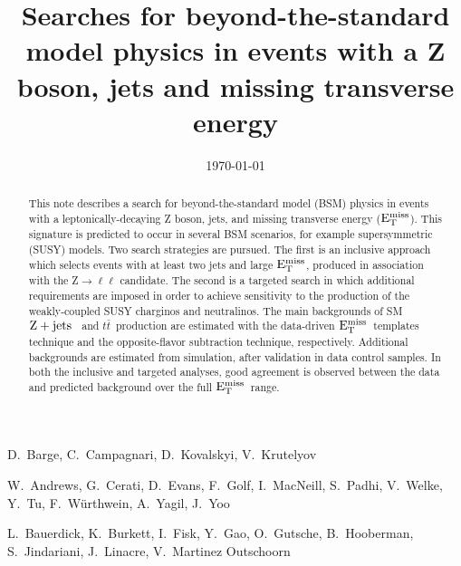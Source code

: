 \documentclass{cmspaper}
\newcommand{\zjets}{$\rm{Z}+\rm{jets}$ }
\newcommand{\ttbar}{\ensuremath{t\bar{t}}}
\newcommand{\MET}{\ensuremath{\rm{E_{T}^{miss}}}}
\begin{document}

\begin{titlepage}


  \date{\today}
 
  \title{Searches for beyond-the-standard model physics in events with a Z boson, jets and missing transverse energy}

  \begin{Authlist}
    D.~Barge, C.~Campagnari, D.~Kovalskyi, V.~Krutelyov

    W.~Andrews, G.~Cerati, D.~Evans, F.~Golf, I.~MacNeill, S.~Padhi, V.~Welke, Y.~Tu, F.~W\"urthwein, 
	A.~Yagil, J.~Yoo

	L.~Bauerdick, K.~Burkett, I.~Fisk, Y.~Gao, O.~Gutsche, B.~Hooberman, S.~Jindariani, J.~Linacre, V.~Martinez Outschoorn
  \end{Authlist}

  \begin{abstract}

This note describes a search for beyond-the-standard model (BSM) physics in events with a leptonically-decaying Z boson, 
jets, and missing transverse energy (\MET).
This signature is predicted to occur in several BSM scenarios, for example supersymmetric (SUSY) models.
Two search strategies are pursued. The first is an inclusive approach which selects events with at least two jets and
large \MET, produced in association with the Z$\to\ell\ell$ candidate. The second is a targeted search 
in which additional requirements are imposed in order to achieve sensitivity to the production of the weakly-coupled
SUSY charginos and neutralinos. The main backgrounds of SM \zjets\ and \ttbar\ production are estimated with the data-driven 
\MET\ templates technique and the opposite-flavor subtraction technique, respectively.
Additional backgrounds are estimated from simulation, after validation in data control samples. 
In both the inclusive and targeted analyses,  good agreement is observed between the data and predicted background over the full \MET\ range. 

\end{abstract}

\end{titlepage}
\end{document}
